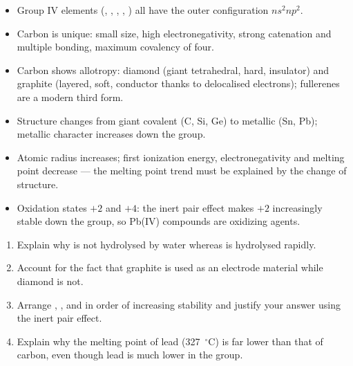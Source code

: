 \documentclass[11pt]{article}
\begin{document}
\begin{aretenir}
\begin{itemize}
\item Group IV elements (, , , , ) all have the outer configuration $ns^2np^2$.
\item Carbon is unique: small size, high electronegativity, strong catenation and multiple bonding, maximum covalency of four.
\item Carbon shows allotropy: diamond (giant tetrahedral, hard, insulator) and graphite (layered, soft, conductor thanks to delocalised electrons); fullerenes are a modern third form.
\item Structure changes from giant covalent (C, Si, Ge) to metallic (Sn, Pb); metallic character increases down the group.
\item Atomic radius increases; first ionization energy, electronegativity and melting point decrease — the melting point trend must be explained by the change of structure.
\item Oxidation states $+2$ and $+4$: the inert pair effect makes $+2$ increasingly stable down the group, so Pb(IV) compounds are oxidizing agents.
\end{itemize}
\end{aretenir}

\begin{exercice}
\begin{enumerate}
\item Explain why  is not hydrolysed by water whereas  is hydrolysed rapidly.
\item Account for the fact that graphite is used as an electrode material while diamond is not.
\item Arrange , ,  and  in order of increasing stability and justify your answer using the inert pair effect.
\item Explain why the melting point of lead (\SI{327}{\ensuremath{{}^{\circ}\mathrm{C}}}) is far lower than that of carbon, even though lead is much lower in the group.
\end{enumerate}
\end{exercice}
\end{document}
